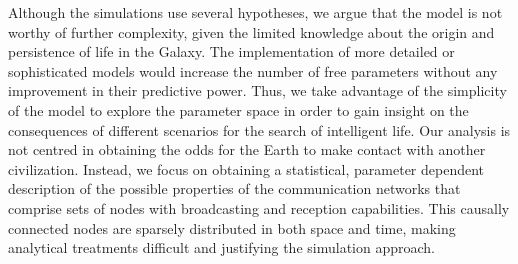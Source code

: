 \documentclass[crop]{CSLB}
\begin{document}
Although the simulations use several hypotheses, we
argue that the model is not worthy of further complexity,
given the limited knowledge about the origin and persistence of
life in the Galaxy.
%
The implementation of more detailed or sophisticated models
would increase the number of free parameters without any 
improvement in their predictive power.
%
Thus, we take advantage of the simplicity of the model to explore
the parameter space in order to gain insight on the consequences of
different scenarios for the search of intelligent life.
%
Our analysis is not centred in obtaining the odds for the Earth
to make contact with another civilization.
%
Instead, we focus on obtaining a statistical, parameter dependent
description of the possible properties of the communication networks
that comprise sets of nodes with broadcasting and reception
capabilities.
%
This causally connected nodes are sparsely distributed in both space
and time, making analytical treatments difficult and justifying
the simulation approach.
\end{document}
